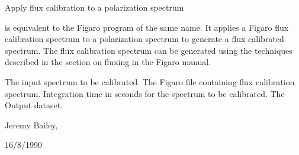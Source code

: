 \begin{manroutinedescription}
        Apply flux calibration to a polarization spectrum

        {} is equivalent to the Figaro program of the same name.
        It applies a Figaro flux calibration spectrum to a {}
        polarization spectrum to generate a flux calibrated spectrum.
        The flux calibration spectrum can be generated using the techniques
        described in the section on fluxing in the Figaro manual.

\begin{manparametertable}
  The input %
spectrum to be calibrated.
     The Figaro file containing %
flux calibration
                               spectrum.
     Integration time in seconds %
for the
                               spectrum to be calibrated.
  The %
Output dataset.

\end{manparametertable}
         Jeremy Bailey, {}

         16/8/1990

\end{manroutinedescription}
